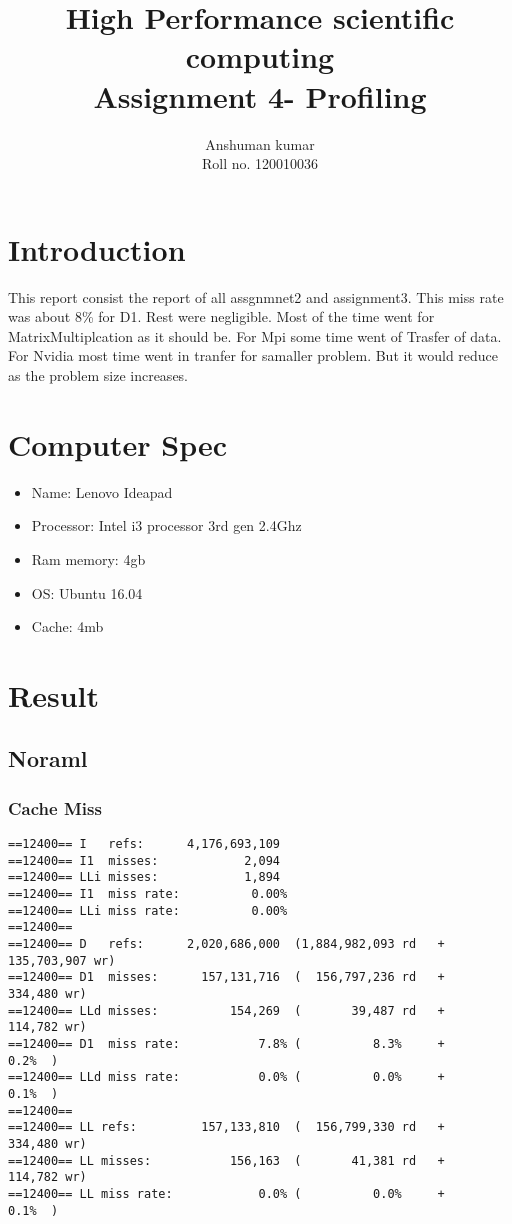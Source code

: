 \documentclass[7pt]{article}
\title {High Performance scientific computing \\
Assignment 4- Profiling }
\author {Anshuman kumar \\
Roll no.  120010036}
\begin{document}
\maketitle
\section{Introduction}
This report consist the report of all assgnmnet2 and assignment3. This miss rate
was about 8\% for D1. Rest were negligible. Most of the time went for MatrixMultiplcation as it should be. For Mpi some time went of Trasfer of data. For Nvidia most time went in tranfer for samaller problem. But it would reduce as the problem size increases.


\section{Computer Spec}
\begin{itemize}
    \item Name: Lenovo Ideapad
    \item Processor: Intel i3 processor 3rd gen 2.4Ghz
    \item Ram memory: 4gb
    \item OS: Ubuntu 16.04
    \item Cache: 4mb
\end{itemize}


\section{Result}
\subsection{Noraml}
\subsubsection{Cache Miss}
\begin{verbatim}
==12400== I   refs:      4,176,693,109
==12400== I1  misses:            2,094
==12400== LLi misses:            1,894
==12400== I1  miss rate:          0.00%
==12400== LLi miss rate:          0.00%
==12400==
==12400== D   refs:      2,020,686,000  (1,884,982,093 rd   + 135,703,907 wr)
==12400== D1  misses:      157,131,716  (  156,797,236 rd   +     334,480 wr)
==12400== LLd misses:          154,269  (       39,487 rd   +     114,782 wr)
==12400== D1  miss rate:           7.8% (          8.3%     +         0.2%  )
==12400== LLd miss rate:           0.0% (          0.0%     +         0.1%  )
==12400==
==12400== LL refs:         157,133,810  (  156,799,330 rd   +     334,480 wr)
==12400== LL misses:           156,163  (       41,381 rd   +     114,782 wr)
==12400== LL miss rate:            0.0% (          0.0%     +         0.1%  )
\end{verbatim}
\end{document}
